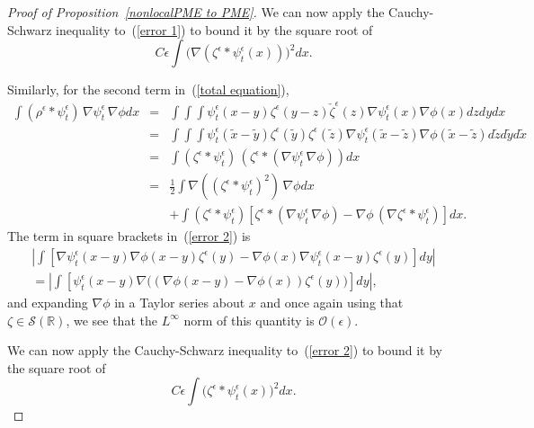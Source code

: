 \documentclass[EJP]{ejpecp} %
\renewcommand{\tilde}{\widetilde}
\newcommand{\IR}{\mathbb R}
\begin{document}
\begin{proof}[Proof of Proposition~\ref{nonlocalPME to PME}]
We can now apply the Cauchy-Schwarz inequality to~(\ref{error 1}) to bound
it by the square root of
\begin{equation}
	C\epsilon\int \big(\nabla(\zeta^\epsilon*\psi_t^\epsilon(x))\big)^2 dx.
\end{equation}

Similarly, for the second term in~(\ref{total equation}),
\begin{eqnarray}
\nonumber
\int (\rho^{\epsilon}*\psi_t^\epsilon)\, \nabla \psi_t^\epsilon\, \nabla\phi dx
&=&
\int\int\int \psi_t^\epsilon(x-y)\zeta^{\epsilon}(y-z)
\check{\zeta}^{\epsilon}(z)\nabla \psi_t^\epsilon(x)\nabla\phi(x) dz dy  dx
\\
\nonumber
&=&
\int\int\int \psi_t^\epsilon(\tilde{x}-\tilde{y})\zeta^{\epsilon}(\tilde{y})
\zeta^{\epsilon}(\tilde{z})\nabla \psi_t^\epsilon(\tilde{x}-\tilde{z})
\nabla\phi(\tilde{x}-\tilde{z}) d \tilde{z} d\tilde{y} d\tilde{x}
\\
\nonumber
	&=&\int(\zeta^{\epsilon}*\psi_t^\epsilon)\,
\left(\zeta^{\epsilon}*(\nabla \psi_t^\epsilon \, \nabla\phi)\right)  dx\\
\nonumber
&=&
\frac{1}{2}\int\nabla ((\zeta^{\epsilon}*\psi_t^\epsilon)^2)
\, \nabla\phi  dx
\\
\label{error 2}
&&+
\int (\zeta^{\epsilon}*\psi_t^\epsilon)
\left[\zeta^{\epsilon}*(\nabla \psi_t^\epsilon\, \nabla\phi)-
\nabla\phi\,(\nabla \zeta^{\epsilon}*\psi_t^\epsilon)\right] dx.
\end{eqnarray}
The term in square brackets in~(\ref{error 2}) is %
\begin{multline*}
\left|\int\left[\nabla \psi_t^\epsilon(x-y)\nabla\phi(x-y)\zeta^{\epsilon}(y)
-\nabla\phi(x)\nabla \psi_t^\epsilon(x-y)\zeta^{\epsilon}(y)
\right] dy\right|
\\
=
	\left|\int\left[\psi_t^\epsilon(x-y)
	\nabla\big((\nabla\phi(x-y)-\nabla\phi(x))\zeta^{\epsilon}(y)\big)
\right] dy\right|,
\end{multline*}
and expanding $\nabla\phi$ in a Taylor series about $x$ and once again using that
$\zeta\in \mathcal{S}(\IR)$, we see that the $L^\infty$ norm of this quantity is
$\mathcal{O}(\epsilon)$.

We can now apply the Cauchy-Schwarz inequality to~(\ref{error 2}) to bound
it by the square root of
\begin{equation}
	C\epsilon\int \big(\zeta^\epsilon*\psi_t^\epsilon(x)\big)^2 dx.
\end{equation}


\end{proof}
\end{document}
